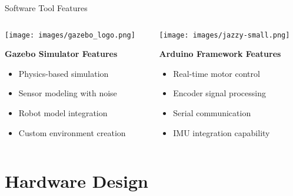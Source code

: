 \documentclass[aspectratio=169]{beamer}
\begin{document}
\begin{frame}{Software Tool Features}
{    \vspace{0.5cm}
    \begin{columns}
      \begin{column}{0.1\textwidth}
        \begin{center}
          \texttt{[image: images/gazebo\_logo.png]}
        \end{center}
        \textbf{Gazebo Simulator Features}
        \begin{itemize}
        \item Physics-based simulation
        \item Sensor modeling with noise
        \item Robot model integration
        \item Custom environment creation
        \end{itemize}
      \end{column}
      \begin{column}{0.1\textwidth}
        \begin{center}
          \texttt{[image: images/jazzy-small.png]}
        \end{center}
        \textbf{Arduino Framework Features}
        \begin{itemize}
        \item Real-time motor control
        \item Encoder signal processing
        \item Serial communication
        \item IMU integration capability
        \end{itemize}
      \end{column}
    \end{columns}
  }
\end{frame}

\section{Hardware Design}
\end{document}
